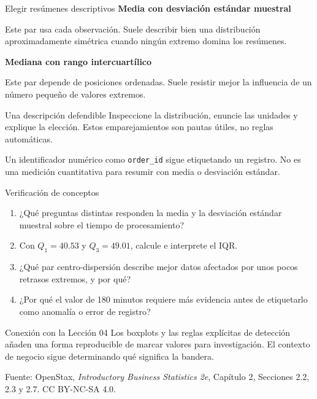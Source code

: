 \documentclass[aspectratio=169,10pt,spanish]{beamer}
\begin{document}
\begin{frame}{Elegir resúmenes descriptivos}
  \small
  \textbf{Media con desviación estándar muestral}\par\vspace{0.2em}
  Este par usa cada observación. Suele describir bien una distribución
  aproximadamente simétrica cuando ningún extremo domina los resúmenes.

  \vspace{0.7em}
  \textbf{Mediana con rango intercuartílico}\par\vspace{0.2em}
  Este par depende de posiciones ordenadas. Suele resistir mejor la
  influencia de un número pequeño de valores extremos.

  \vspace{0.8em}
  \begin{alertblock}{Una descripción defendible}
    Inspeccione la distribución, enuncie las unidades y explique la elección.
    Estos emparejamientos son pautas útiles, no reglas automáticas.
  \end{alertblock}

  Un identificador numérico como \texttt{order\_id} sigue etiquetando un
  registro. No es una medición cuantitativa para resumir con media o
  desviación estándar.
\end{frame}

\begin{frame}{Verificación de conceptos}
  \begin{enumerate}
    \item ¿Qué preguntas distintas responden la media y la desviación
      estándar muestral sobre el tiempo de procesamiento?
    \item Con $Q_1=40.53$ y $Q_3=49.01$, calcule e interprete el IQR.
    \item ¿Qué par centro-dispersión describe mejor datos afectados por unos
      pocos retrasos extremos, y por qué?
    \item ¿Por qué el valor de 180 minutos requiere más evidencia antes de
      etiquetarlo como anomalía o error de registro?
  \end{enumerate}

  \vspace{0.5em}
  \begin{block}{Conexión con la Lección 04}
    Los boxplots y las reglas explícitas de detección añaden una forma
    reproducible de marcar valores para investigación. El contexto de
    negocio sigue determinando qué significa la bandera.
  \end{block}

  \vfill
  \scriptsize Fuente: OpenStax, \textit{Introductory Business Statistics 2e},
  Capítulo 2, Secciones 2.2, 2.3 y 2.7. CC BY-NC-SA 4.0.
\end{frame}

\appendix
\end{document}

